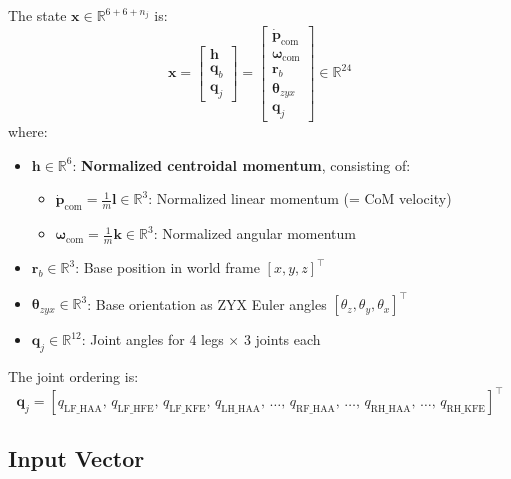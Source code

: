 \documentclass[11pt,a4paper]{article}
\newcommand{\R}{\mathbb{R}}
\begin{document}
The state $\bm{x} \in \R^{6+6+n_j}$ is:
\begin{equation}
	\bm{x} = \begin{bmatrix} \bm{h} \\ \bm{q}_b \\ \bm{q}_j \end{bmatrix}
	= \begin{bmatrix} \dot{\bm{p}}_{\text{com}} \\ \bm{\omega}_{\text{com}} \\ \bm{r}_b \\ \bm{\theta}_{zyx} \\ \bm{q}_j \end{bmatrix}
	\in \R^{24}
\end{equation}
where:
\begin{itemize}
	\item $\bm{h} \in \R^6$: \textbf{Normalized centroidal momentum}, consisting of:
	      \begin{itemize}
		      \item $\dot{\bm{p}}_{\text{com}} = \frac{1}{m}\bm{l} \in \R^3$: Normalized linear momentum (= CoM velocity)
		      \item $\bm{\omega}_{\text{com}} = \frac{1}{m}\bm{k} \in \R^3$: Normalized angular momentum
	      \end{itemize}
	\item $\bm{r}_b \in \R^3$: Base position in world frame $[x, y, z]^\top$
	\item $\bm{\theta}_{zyx} \in \R^3$: Base orientation as ZYX Euler angles $[\theta_z, \theta_y, \theta_x]^\top$
	\item $\bm{q}_j \in \R^{12}$: Joint angles for 4 legs $\times$ 3 joints each
\end{itemize}

\noindent The joint ordering is:
\begin{equation*}
	\bm{q}_j = [q_{\text{LF\_HAA}},\, q_{\text{LF\_HFE}},\, q_{\text{LF\_KFE}},\,
	q_{\text{LH\_HAA}},\, \ldots,\,
	q_{\text{RF\_HAA}},\, \ldots,\,
	q_{\text{RH\_HAA}},\, \ldots,\, q_{\text{RH\_KFE}}]^\top
\end{equation*}

\subsection{Input Vector}
\end{document}
